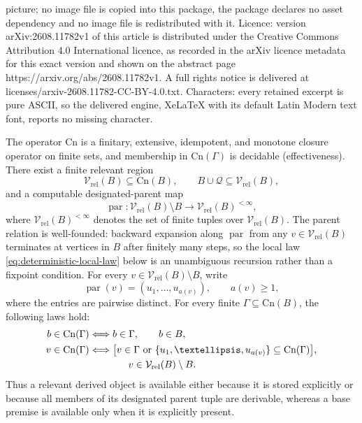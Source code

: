 \documentclass[10pt,a4paper]{amsart}
\newcommand{\Cn}{\text{Cn}}
\begin{document}
picture; no image file is copied into this package, the package declares no asset dependency and no image file is redistributed with it. Licence: version arXiv:2608.11782v1 of this article is distributed under the Creative Commons Attribution 4.0 International licence, as recorded in the arXiv licence metadata for this exact version and shown on the abstract page https://arxiv.org/abs/2608.11782v1. A full rights notice is delivered at licenses/arxiv-2608.11782-CC-BY-4.0.txt. Characters: every retained excerpt is pure ASCII, so the delivered engine, XeLaTeX with its default Latin Modern text font, reports no missing character.
\begin{assumption}
\label{assump:det-local}
The operator \(\Cn\) is a finitary, extensive, idempotent, and monotone
closure operator on finite sets, and membership in \(\Cn(\Gamma)\) is
decidable (effectiveness).  There exist a finite relevant region
\[
  \mathcal V_{\mathrm{rel}}(B)\subseteq\Cn(B),
  \qquad
  B\cup\mathcal Q\subseteq\mathcal V_{\mathrm{rel}}(B),
\]
and a computable designated-parent map
\[
  \operatorname{par}:
  \mathcal V_{\mathrm{rel}}(B)\setminus B
  \longrightarrow
  \mathcal V_{\mathrm{rel}}(B)^{<\infty},
\]
where \(\mathcal V_{\mathrm{rel}}(B)^{<\infty}\) denotes the set of finite
tuples over \(\mathcal V_{\mathrm{rel}}(B)\).  The parent relation is
well-founded: backward expansion along \(\operatorname{par}\) from any
\(v\in\mathcal V_{\mathrm{rel}}(B)\) terminates at vertices in \(B\) after
finitely many steps, so the local law \eqref{eq:deterministic-local-law}
below is an unambiguous recursion rather than a fixpoint condition.
For every
\(v\in\mathcal V_{\mathrm{rel}}(B)\setminus B\), write
\[
  \operatorname{par}(v)
  =
  (u_1,\ldots,u_{a(v)}),
  \qquad a(v)\ge 1,
\]
where the entries are pairwise distinct.  For every finite
\(\Gamma\subseteq\Cn(B)\), the following laws hold:
\begin{align}
  b\in\Cn(\Gamma) &\Longleftrightarrow b\in\Gamma, \qquad b\in B, \label{eq:base-irreducibility}\\
  v\in\Cn(\Gamma) &\Longleftrightarrow 
    \bigl[v\in\Gamma \text{ or } \{u_1,\ldots,u_{a(v)}\}\subseteq\Cn(\Gamma)\bigr], \notag\\
  &\qquad\qquad v\in\mathcal V_{\mathrm{rel}}(B)\setminus B. \label{eq:deterministic-local-law}
\end{align}
Thus a relevant derived object is available either because it is stored
explicitly or because all members of its designated parent tuple are
derivable, whereas a base premise is available only when it is explicitly
present.
\end{assumption}
\end{document}
